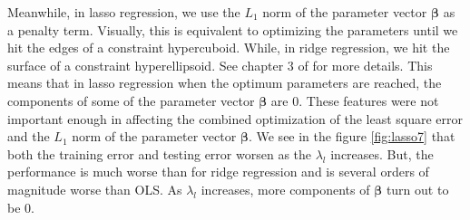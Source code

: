 Meanwhile, in lasso regression, we use the $L_1$ norm of the parameter vector $\boldsymbol \beta$ as a penalty term. Visually, this is equivalent to optimizing the parameters until we hit the edges of a constraint hypercuboid. While, in ridge regression, we hit the surface of a constraint hyperellipsoid. See chapter 3 of \cite{friedman2001elements} for more details. This means that in lasso regression when the optimum parameters are reached, the components of some of the parameter vector $\boldsymbol \beta$ are 0. These features were not important enough in affecting the combined optimization of the least square error and the $L_1$ norm of the parameter vector $\boldsymbol \beta$. We see in the figure \ref{fig:lasso7} that both the training error and testing error worsen as the $\lambda_l$ increases. But, the performance is much worse than for ridge regression and is several orders of magnitude worse than OLS. As $\lambda_l$ increases, more components of $\boldsymbol \beta$ turn out to be 0. 



